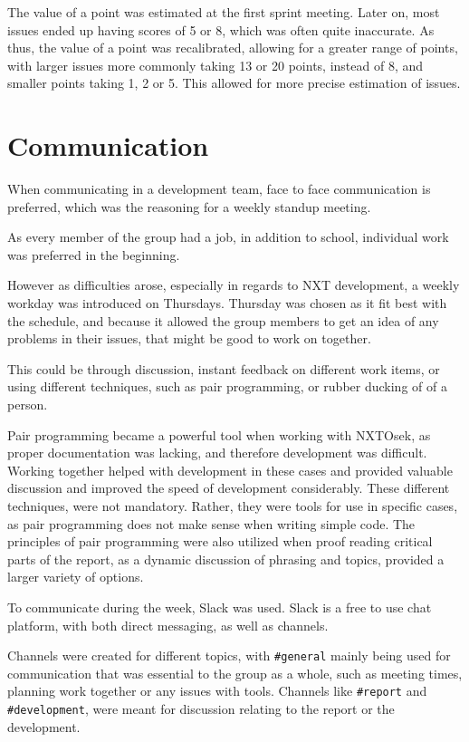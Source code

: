 The value of a point was estimated at the first sprint meeting.
Later on, most issues ended up having scores of 5 or 8, which was often quite inaccurate.
As thus, the value of a point was recalibrated, allowing for a greater range of points, with larger issues more commonly taking 13 or 20 points, instead of 8, and smaller points taking 1, 2 or 5.
This allowed for more precise estimation of issues.

\section{Communication}
When communicating in a development team, face to face communication is preferred, which was the reasoning for a weekly standup meeting.

As every member of the group had a job, in addition to school, individual work was preferred in the beginning.

However as difficulties arose, especially in regards to NXT development, a weekly workday was introduced on Thursdays.
Thursday was chosen as it fit best with the schedule, and because it allowed the group members to get an idea of any problems in their issues, that might be good to work on together.

This could be through discussion, instant feedback on different work items, or using different techniques, such as pair programming, or rubber ducking of of a person.

Pair programming became a powerful tool when working with NXTOsek, as proper documentation was lacking, and therefore development was difficult.
Working together helped with development in these cases and provided valuable discussion and improved the speed of development considerably.
These different techniques, were not mandatory.
Rather, they were tools for use in specific cases, as pair programming does not make sense when writing simple code.
The principles of pair programming were also utilized when proof reading critical parts of the report, as a dynamic discussion of phrasing and topics, provided a larger variety of options.

To communicate during the week, Slack was used.
Slack is a free to use chat platform, with both direct messaging, as well as channels.

Channels were created for different topics, with \texttt{\#general} mainly being used for communication that was essential to the group as a whole, such as meeting times, planning work together or any issues with tools.
Channels like \texttt{\#report} and \texttt{\#development}, were meant for discussion relating to the report or the development.

